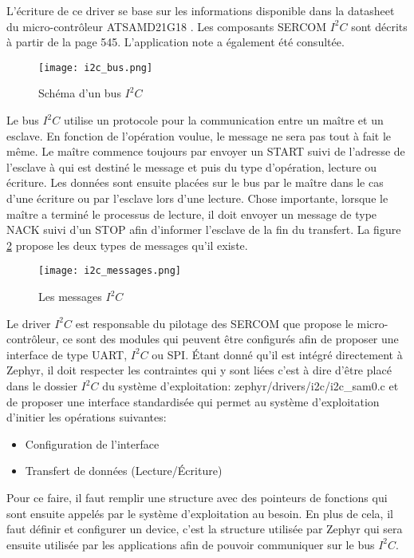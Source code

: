 L'écriture de ce driver se base sur les informations disponible dans la datasheet du micro-contrôleur ATSAMD21G18 \cite{samd21-datasheet}. Les composants SERCOM $I^{2}C$ sont décrits à partir de la page 545. L'application note \cite{samd21-i2c-configuration} a également été consultée.

\begin{figure}[htb]
\centering 
\texttt{[image: i2c\_bus.png]} 
\caption{Schéma d'un bus $I^{2}C$}
\label{fig:i2c_bus}
\end{figure}

Le bus $I^{2}C$ utilise un protocole pour la communication entre un maître et un esclave. En fonction de l'opération voulue, le message ne sera pas tout à fait le même. Le maître commence toujours par envoyer un START suivi de l'adresse de l'esclave à qui est destiné le message et puis du type d'opération, lecture ou écriture. Les données sont ensuite placées sur le bus par le maître dans le cas d'une écriture ou par l'esclave lors d'une lecture. Chose importante, lorsque le maître a terminé le processus de lecture, il doit envoyer un message de type NACK suivi d'un STOP afin d'informer l'esclave de la fin du transfert.
La figure \ref{fig:i2c_messages} propose les deux types de messages qu'il existe.

\begin{figure}[htb]
\centering 
\texttt{[image: i2c\_messages.png]} 
\caption{Les messages $I^{2}C$}
\label{fig:i2c_messages}
\end{figure}

Le driver $I^{2}C$ est responsable du pilotage des SERCOM que propose le micro-contrôleur, ce sont des modules qui peuvent être configurés afin de proposer une interface de type UART, $I^{2}C$ ou SPI. Étant donné qu'il est intégré directement à Zephyr, il doit respecter les contraintes qui y sont liées c'est à dire d'être placé dans le dossier $I^{2}C$ du système d'exploitation: zephyr/drivers/i2c/i2c\_sam0.c et de proposer une interface standardisée qui permet au système d'exploitation d'initier les opérations suivantes:

\begin{itemize}
\item Configuration de l'interface
\item Transfert de données (Lecture/Écriture)
\end{itemize}

Pour ce faire, il faut remplir une structure avec des pointeurs de fonctions qui sont ensuite appelés par le système d'exploitation au besoin. En plus de cela, il faut définir et configurer un device, c'est la structure utilisée par Zephyr qui sera ensuite utilisée par les applications afin de pouvoir communiquer sur le bus $I^{2}C$.

